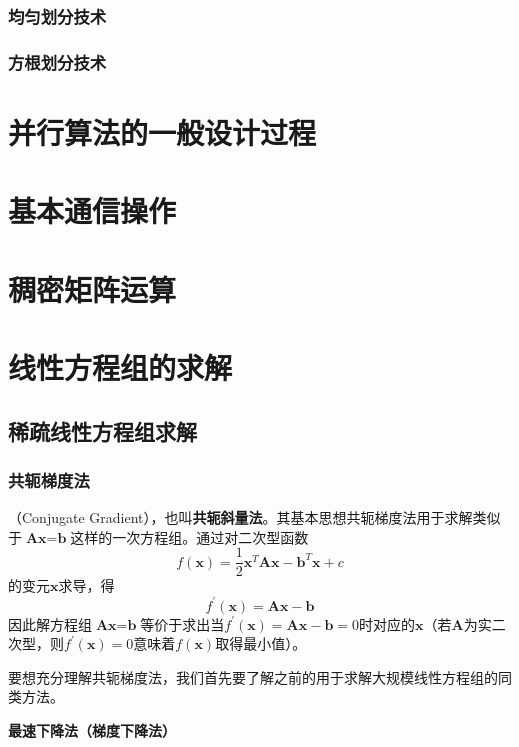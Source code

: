 \documentclass{article}
\begin{document}
				\subsubsection{均匀划分技术}
				\subsubsection{方根划分技术}
				
		\section{并行算法的一般设计过程}
		\section{基本通信操作}
		\section{稠密矩阵运算}
		\section{线性方程组的求解}
			\subsection{稀疏线性方程组求解}
				\subsubsection{共轭梯度法}
					（Conjugate Gradient），也叫\textbf{共轭斜量法}。其基本思想共轭梯度法用于求解类似于$\textbf{A}\textbf{x}=\textbf{b}$这样的一次方程组。通过对二次型函数
					$$f(\textbf{x})=\frac{1}{2}\textbf{x}^{T}\textbf{A}\textbf{x}-\textbf{b}^{T}\textbf{x}+c$$
					的变元$\textbf{x}$求导，得
					$$f^{'}(\textbf{x})=\textbf{A}\textbf{x}-\textbf{b}$$
					因此解方程组$\textbf{A}\textbf{x}=\textbf{b}$等价于求出当$f^{'}(\textbf{x})=\textbf{A}\textbf{x}-\textbf{b}=0$时对应的$\textbf{x}$（若$\textbf{A}$为实二次型，则$f^{'}(\textbf{x})=0$意味着$f(\textbf{x})$取得最小值）。
					
					要想充分理解共轭梯度法，我们首先要了解之前的用于求解大规模线性方程组的同类方法。
					
					\textbf{最速下降法（梯度下降法）}
					
\end{document}
